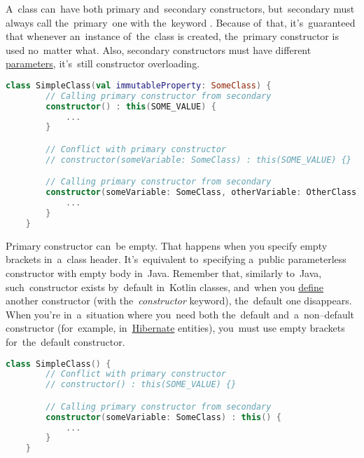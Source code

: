 \noindent A~class can~have both primary and~secondary constructors, but~secondary must always call the~primary~one with the~keyword .
Because of~that, it's~guaranteed that whenever an~instance of~the~class is created, the~primary constructor is used no~matter what.
Also, secondary constructors must have different \hyperref[parameterargument]{parameters}, it's~still constructor \mbox{overloading.}

\begin{lstlisting}[language=Kotlin]
    class SimpleClass(val immutableProperty: SomeClass) {
        // Calling primary constructor from secondary
        constructor() : this(SOME_VALUE) {
            ...
        }

        // Conflict with primary constructor
        // constructor(someVariable: SomeClass) : this(SOME_VALUE) {}

        // Calling primary constructor from secondary
        constructor(someVariable: SomeClass, otherVariable: OtherClass) : this(SOME_VALUE) {
            ...
        }
    }
\end{lstlisting}
\newline

\enlargethispage{10mm}
\thispagestyle{empty}
\noindent Primary constructor can~be empty.
That happens when you specify empty brackets in~a~class header.
It's~equivalent to~specifying a~public parameterless constructor with empty body in~Java.
Remember that, similarly to~Java, such~constructor exists by~default in~Kotlin classes, and~when you \hyperref[declarationdefinition]{define} another constructor (with the~\textit{constructor} keyword), the~default one disappears.
When you're in~a~situation where you~need both the~default and~a~non--default constructor (for~example, in~\hyperref[hibernate]{Hibernate} entities), you~must use empty brackets for~the~default constructor.
\newpage

\begin{lstlisting}[language=Kotlin]
    class SimpleClass() {
        // Conflict with primary constructor
        // constructor() : this(SOME_VALUE) {}

        // Calling primary constructor from secondary
        constructor(someVariable: SomeClass) : this() {
            ...
        }
    }
\end{lstlisting}
